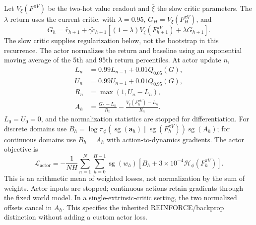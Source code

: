 \documentclass{article}
\begin{document}
Let $V_\xi(F^{\pi V})$ be the two-hot value readout and $\bar\xi$ the slow critic parameters. The $\lambda$ return uses the current critic, with $\lambda=0.95$, $G_H=V_\xi(F_H^{\pi V})$, and
\begin{equation}
G_h=\hat r_{h+1}+\gamma\tilde c_{h+1}\left[
(1-\lambda)V_\xi(F_{h+1}^{\pi V})+\lambda G_{h+1}\right].
\label{eq:lambda_return}
\end{equation}
The slow critic supplies regularization below, not the bootstrap in this recurrence. The actor normalizes the return and baseline using an exponential moving average of the 5th and 95th return percentiles. At actor update $n$,
\begin{align}
L_n&=0.99L_{n-1}+0.01Q_{0.05}(G),\\
U_n&=0.99U_{n-1}+0.01Q_{0.95}(G),\\
R_n&=\max(1,U_n-L_n),\\
A_h&=\frac{G_h-L_n}{R_n}-\frac{V_\xi(F_h^{\pi V})-L_n}{R_n}.
\label{eq:return_normalization}
\end{align}
$L_0=U_0=0$, and the normalization statistics are stopped for differentiation. For discrete domains use $B_h=\log\pi_\phi(\operatorname{sg}(\mathbf a_h)\mid\operatorname{sg}(F_h^{\pi V}))\operatorname{sg}(A_h)$; for continuous domains use $B_h=A_h$ with action-to-dynamics gradients. The actor objective is
\begin{equation}
\mathcal L_{\mathrm{actor}}=-\frac1{NH}\sum_{n=1}^{N}\sum_{h=0}^{H-1}
\operatorname{sg}(w_h)\left[B_h+3\times10^{-4}\mathcal H_\phi(F_h^{\pi V})\right].
\label{eq:actor_loss}
\end{equation}
This is an arithmetic mean of weighted losses, not normalization by the sum of weights. Actor inputs are stopped; continuous actions retain gradients through the fixed world model. In a single-extrinsic-critic setting, the two normalized offsets cancel in $A_h$. This specifies the inherited REINFORCE/backprop distinction without adding a custom actor loss.
\end{document}
